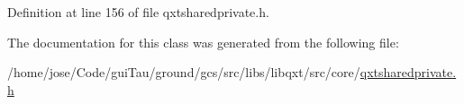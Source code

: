 Definition at line 156 of file qxtsharedprivate.\-h.



The documentation for this class was generated from the following file\-:\begin{DoxyCompactItemize}
\item 
/home/jose/\-Code/gui\-Tau/ground/gcs/src/libs/libqxt/src/core/\hyperlink{qxtsharedprivate_8h}{qxtsharedprivate.\-h}\end{DoxyCompactItemize}
